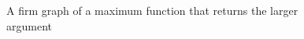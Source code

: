 \begin{figure}
    \centering
    
    \caption{A firm graph of a maximum function that returns the larger argument}
    \label{fig:basics:firm}
\end{figure}
